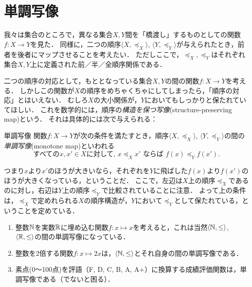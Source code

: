 \documentclass[dvipdfmx,11pt,a4paper]{jsarticle}
\begin{document}
\section{単調写像}
我々は集合のところで，異なる集合$X, Y$間を「橋渡し」するものとしての関数$f:X \to Y$を見た．
同様に，二つの順序$\langle X, \preceq_X \rangle$, $\langle Y, \preceq_Y \rangle$が与えられたとき，前者を後者にマップさせることを考えたい．
ただしここで，$\preceq_X, \preceq_Y$はそれぞれ集合$X,Y$上に定義された前／半／全順序関係である．

二つの順序の対応として，もととなっている集合$X, Y$の間の関数$f:X \to Y$を考える．
しかしこの関数が$X$の順序をめちゃくちゃにしてしまったら，「順序の対応」とはいえない．
むしろ$X$の大小関係が，$Y$においてもしっかりと保たれていてほしい．
これを数学的には，順序の\emph{構造を保つ写像}(structure-preserving map)という．
それは具体的には次で与えられる：
\begin{itembox}[l]{単調写像}
関数$f:X \to Y$が次の条件を満たすとき，順序$\langle X, \preceq_X \rangle$, $\langle Y, \preceq_Y \rangle$の間の\emph{単調写像}(monotone map)といわれる
\[
 \text{すべての}x, x' \in X \text{に対して, }  x \preceq_X x' \text{ ならば } f(x) \preceq_Y f(x').
\]
\end{itembox}
つまり$x$より$x'$のほうが大きいなら，それぞれを$Y$に飛ばした$f(x)$より$f(x')$のほうが大きくなっている，ということだ．
ここで，左辺は$X$上の順序$\preceq_X$であるのに対し，右辺は$Y$上の順序$\preceq_Y$で比較されていることに注意．
よって上の条件は，$\preceq_X$で定めれられる$X$の順序構造が，$Y$において$\preceq_Y$として保たれている，ということを定めている．

\begin{example}
 \begin{enumerate}
  \item 整数$\mathbb{N}$を実数$\mathbb{R}$に埋め込む関数$f:x \mapsto x$を考えると，これは当然$\langle \mathbb{N}, \leq \rangle$, $\langle \mathbb{R}, \leq \rangle$の間の単調写像になっている．
  \item 整数を2倍する関数$f:x \mapsto 2x$は，$\langle \mathbb{N}, \leq \rangle$とそれ自身の間の単調写像である．
  \item 素点(0〜100点)を評語（F, D, C, B, A, A+）に換算する成績評価関数は，単調写像である（でないと困る）．
 \end{enumerate}
\end{example}
\end{document}
